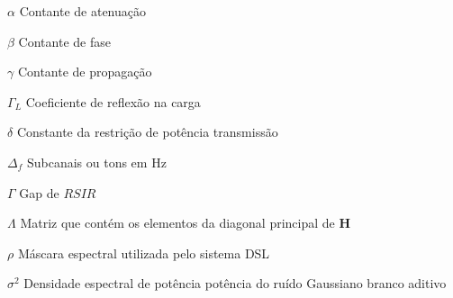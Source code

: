 \documentclass[
	12pt,				%
	openright,			%
	oneside,			%
	a4paper,			%
	english,			%
	brazil				%
	]{abntex2}
\begin{document}
\begin{simbolos}
  \item[$\alpha$] Contante de atenuação
  \item[$\beta$] Contante de fase
  \item[$\gamma$] Contante de propagação
  \item[$\Gamma_{L}$] Coeficiente de reflexão na carga
  \item[$\delta$] Constante da restrição de potência transmissão
  \item[$\Delta_f$ ] Subcanais ou tons em Hz
  \item[$ \Gamma $]  Gap de $RSIR$
  \item[$ \Lambda $] Matriz que contém os elementos da diagonal principal de $\mathbf{H}$
  \item[$\rho$] Máscara espectral utilizada pelo sistema DSL
  \item[${\sigma}^{2}$]  Densidade espectral de potência potência do ruído Gaussiano branco aditivo
\end{simbolos}

\tableofcontents*
\cleardoublepage



%
%
%	
%	
%	
%	
%	
%
%
%
%
%


\textual
\end{document}
